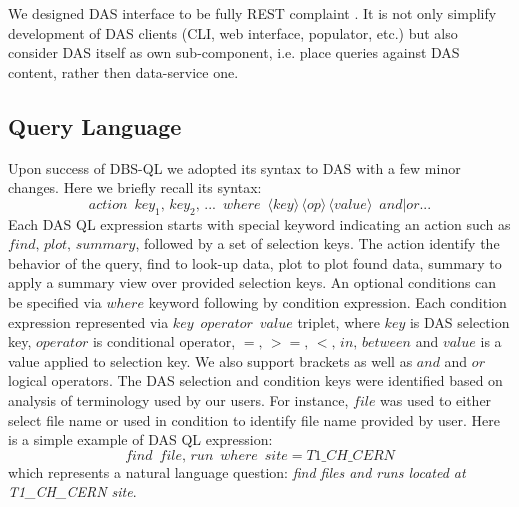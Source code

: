 \documentclass[a4paper]{jpconf}
\begin{document}
We designed DAS interface to be fully REST complaint \cite{REST}. It is not
only simplify development of DAS clients (CLI, web interface, populator, etc.)
but also consider DAS itself as own sub-component, i.e. place queries against
DAS content, rather then data-service one.

\subsection{Query Language\label{DAS-QL}}
Upon success of DBS-QL \cite{DBS-QL} we adopted its syntax to DAS with a few minor
changes. Here we briefly recall its syntax:
\begin{equation}
action\,\,\,
key_1,\, key_2,\, ...\,\,\, where\,\,\,
\langle key\rangle\, 
\langle op\rangle\, 
\langle value\rangle \,\,\, and|or ...
\label{QL_syntax}
\end{equation}
Each DAS QL expression starts with special keyword indicating an action such as 
$find,\, plot,\, summary$, followed by a set of selection keys. The action identify
the behavior of the query, find to look-up data, plot to plot found data, summary to
apply a summary view over provided selection keys. An optional conditions can be 
specified via $where$ keyword following by condition expression.
Each condition expression represented via $key\,\,\, operator\,\,\, value$ triplet, where
$key$ is DAS selection key, $operator$ is conditional operator, 
$=,\, >=,\, <,\, in,\, between$ and $value$ is a value applied to selection key.
We also support brackets as well as $and$ and $or$ logical operators.
The DAS selection and condition keys were identified based on analysis 
of terminology used by our users. For instance, $file$ was used to either
select file name or used in condition to identify file name provided by user.
Here is a simple example of DAS QL expression:
$$
find\,\,\, file,\, run\,\,\, where\,\,\, site=T1\_CH\_CERN
$$
which represents a natural language question: 
{\it find files and runs located at T1\_CH\_CERN site}.
\end{document}
